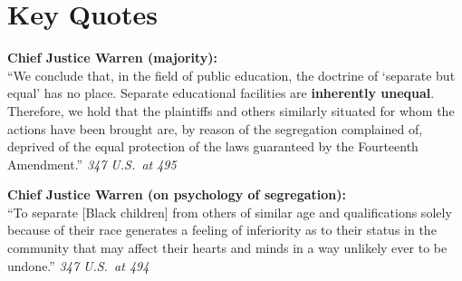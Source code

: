 \section{Key Quotes}

\begin{tcolorbox}[sidenotebox]
  \textbf{Chief Justice Warren (majority):}\\[3pt]
  ``We conclude that, in the field of public education, the doctrine of `separate but equal'
  has no place.  Separate educational facilities are \textbf{inherently unequal}.  Therefore,
  we hold that the plaintiffs and others similarly situated for whom the actions have been
  brought are, by reason of the segregation complained of, deprived of the equal protection
  of the laws guaranteed by the Fourteenth Amendment.''
  \hfill\textit{347 U.S.\ at 495}
\end{tcolorbox}

\begin{tcolorbox}[sidenotebox]
  \textbf{Chief Justice Warren (on psychology of segregation):}\\[3pt]
  ``To separate [Black children] from others of similar age and qualifications solely
  because of their race generates a feeling of inferiority as to their status in the community
  that may affect their hearts and minds in a way unlikely ever to be undone.''
  \hfill\textit{347 U.S.\ at 494}
\end{tcolorbox}

